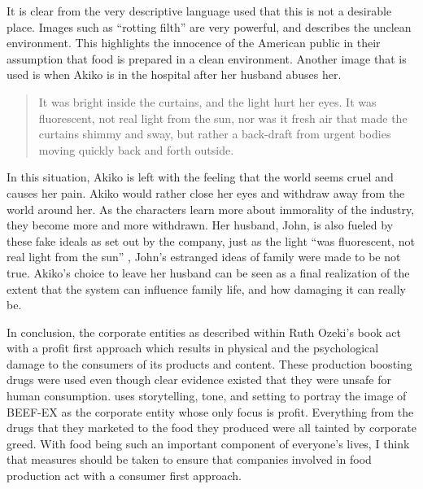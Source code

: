 \documentclass{article}
\begin{document}
It is clear from the very descriptive language used that this is not a
desirable place. Images such as ``rotting filth'' \cite[Ch. 10]{ozeki1998my}
are very powerful, and describes the unclean environment. This highlights
the innocence of the American public in their assumption that food is
prepared in a clean environment. Another image that is used is when Akiko is
in the hospital after her husband abuses her.

\begin{quote}
It was bright inside the curtains, and the light hurt her eyes. It was
fluorescent, not real light from the sun, nor was it fresh air that made the
curtains shimmy and sway, but rather a back-draft from urgent bodies moving
quickly back and forth outside. \cite[Ch. 11]{ozeki1998my}
\end{quote}

In this situation, Akiko is left with the feeling that the world seems cruel
and causes her pain. Akiko would rather close her eyes and withdraw away
from the world around her. As the characters learn more about immorality of
the industry, they become more and more withdrawn. Her husband, John, is
also fueled by these fake ideals as set out by the company, just as the
light ``was fluorescent, not real light from the sun'' \cite[Ch.
11]{ozeki1998my}, John's estranged ideas of family were made to be not true.
Akiko's choice to leave her husband can be seen as a final realization of
the extent that the system can influence family life, and how damaging it
can really be.


In conclusion, the corporate entities as described within Ruth Ozeki's book
 act with a profit first approach which results in
physical and the psychological damage to the consumers of its products and
content. These production boosting drugs were used even though clear
evidence existed that they were unsafe for human consumption.
\citeauthor{ozeki1998my} uses storytelling, tone, and setting to portray the
image of BEEF-EX as the corporate entity whose only focus is profit.
Everything from the drugs that they marketed to the food they produced were
all tainted by corporate greed. With food being such an important component
of everyone's lives, I think that measures should be taken to ensure that
companies involved in food production act with a consumer first approach.

\makeworkscited
\end{document}
